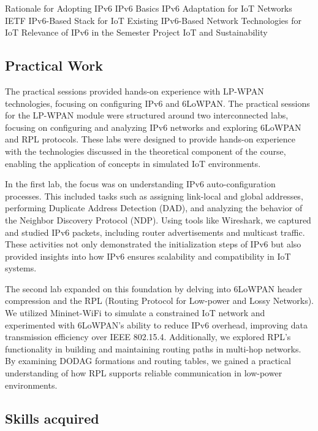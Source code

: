 Rationale for Adopting IPv6
IPv6 Basics
IPv6 Adaptation for IoT Networks
IETF IPv6-Based Stack for IoT
Existing IPv6-Based Network Technologies for IoT
Relevance of IPv6 in the Semester Project
IoT and Sustainability

\subsection{Practical Work}
\indent \indent The practical sessions provided hands-on experience with LP-WPAN technologies, focusing on configuring IPv6 and 6LoWPAN.
The practical sessions for the LP-WPAN module were structured around two interconnected labs, focusing on configuring and analyzing IPv6 networks and exploring 6LoWPAN and RPL protocols. These labs were designed to provide hands-on experience with the technologies discussed in the theoretical component of the course, enabling the application of concepts in simulated IoT environments.

\vspace{0.25cm}
In the first lab, the focus was on understanding IPv6 auto-configuration processes. This included tasks such as assigning link-local and global addresses, performing Duplicate Address Detection (DAD), and analyzing the behavior of the Neighbor Discovery Protocol (NDP). Using tools like Wireshark, we captured and studied IPv6 packets, including router advertisements and multicast traffic. These activities not only demonstrated the initialization steps of IPv6 but also provided insights into how IPv6 ensures scalability and compatibility in IoT systems.

\vspace{0.25cm}
The second lab expanded on this foundation by delving into 6LoWPAN header compression and the RPL (Routing Protocol for Low-power and Lossy Networks).
We utilized Mininet-WiFi to simulate a constrained IoT network and experimented with 6LoWPAN's ability to reduce IPv6 overhead, improving data transmission efficiency over IEEE 802.15.4.
Additionally, we explored RPL's functionality in building and maintaining routing paths in multi-hop networks.
By examining DODAG formations and routing tables, we gained a practical understanding of how RPL supports reliable communication in low-power environments.


\subsection{Skills acquired}

